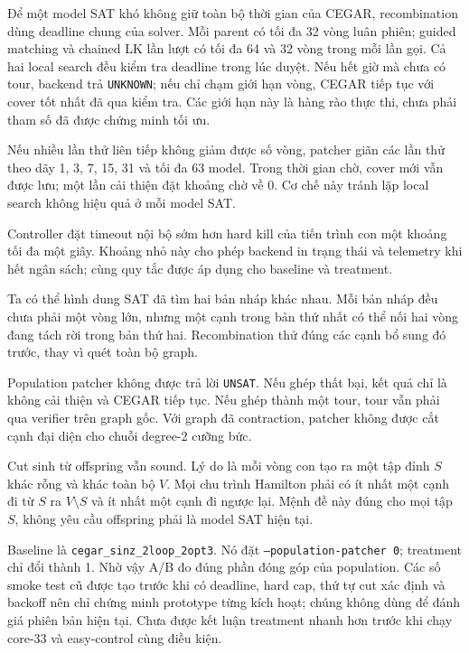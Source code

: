 \documentclass[11pt,a4paper,oneside]{scrreprt}
\newcommand{\code}[1]{\texttt{#1}}
\begin{document}
Để một model SAT khó không giữ toàn bộ thời gian của CEGAR, recombination dùng
deadline chung của solver. Mỗi parent có tối đa 32 vòng luân phiên; guided
matching và chained LK lần lượt có tối đa 64 và 32 vòng trong mỗi lần gọi. Cả
hai local search đều kiểm tra deadline trong lúc duyệt. Nếu hết giờ mà chưa có
tour, backend trả \code{UNKNOWN}; nếu chỉ chạm giới hạn vòng, CEGAR tiếp tục với
cover tốt nhất đã qua kiểm tra. Các giới hạn này là hàng rào thực thi, chưa phải
tham số đã được chứng minh tối ưu.

Nếu nhiều lần thử liên tiếp không giảm được số vòng, patcher giãn các lần thử
theo dãy 1, 3, 7, 15, 31 và tối đa 63 model. Trong thời gian chờ, cover mới vẫn
được lưu; một lần cải thiện đặt khoảng chờ về 0. Cơ chế này tránh lặp local
search không hiệu quả ở mỗi model SAT.

Controller đặt timeout nội bộ sớm hơn hard kill của tiến trình con một khoảng
tối đa một giây. Khoảng nhỏ này cho phép backend in trạng thái và telemetry khi
hết ngân sách; cùng quy tắc được áp dụng cho baseline và treatment.

Ta có thể hình dung SAT đã tìm hai bản nháp khác nhau. Mỗi bản nháp đều chưa phải một vòng lớn, nhưng một cạnh trong bản thứ nhất có thể nối hai vòng đang tách rời trong bản thứ hai. Recombination thử đúng các cạnh bổ sung đó trước, thay vì quét toàn bộ graph.

\begin{resultbox}
Population patcher không được trả lời \code{UNSAT}. Nếu ghép thất bại, kết quả chỉ là không cải thiện và CEGAR tiếp tục. Nếu ghép thành một tour, tour vẫn phải qua verifier trên graph gốc. Với graph đã contraction, patcher không được cắt cạnh đại diện cho chuỗi degree-2 cưỡng bức.
\end{resultbox}

Cut sinh từ offspring vẫn sound. Lý do là mỗi vòng con tạo ra một tập đỉnh $S$ khác rỗng và khác toàn bộ $V$. Mọi chu trình Hamilton phải có ít nhất một cạnh đi từ $S$ ra $V\setminus S$ và ít nhất một cạnh đi ngược lại. Mệnh đề này đúng cho mọi tập $S$, không yêu cầu offspring phải là model SAT hiện tại.

Baseline là \code{cegar\_sinz\_2loop\_2opt3}. Nó đặt \code{--population-patcher 0}; treatment chỉ đổi thành 1. Nhờ vậy A/B đo đúng phần đóng góp của population. Các số smoke test cũ được tạo trước khi có deadline, hard cap, thứ tự cut xác định và backoff nên chỉ chứng minh prototype từng kích hoạt; chúng không dùng để đánh giá phiên bản hiện tại. Chưa được kết luận treatment nhanh hơn trước khi chạy core-33 và easy-control cùng điều kiện.
\end{document}
